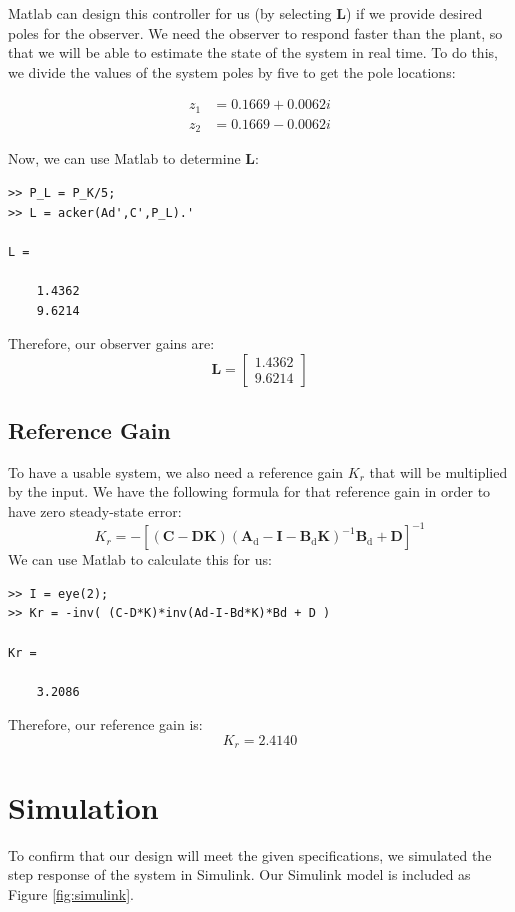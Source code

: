 \documentclass[11pt]{article}
\begin{document}
Matlab can design this controller for us (by selecting {\bf L}) if we provide desired poles for the observer.
We need the observer to respond faster than the plant, so that we will be able to estimate the state of the system in real time.
To do this, we divide the values of the system poles by five to get the pole locations:

\begin{align*}
z_1 &= 0.1669 + 0.0062i \\ z_2 &= 0.1669 - 0.0062i
\end{align*}

Now, we can use Matlab to determine {\bf L}:
\small
\begin{verbatim}
>> P_L = P_K/5;
>> L = acker(Ad',C',P_L).'

L =

    1.4362
    9.6214
\end{verbatim}

Therefore, our observer gains are:
\[\mathbf{L} = 
    \begin{bmatrix}
       1.4362 \\
       9.6214
    \end{bmatrix}
\]

\subsection*{Reference Gain}
To have a usable system, we also need a reference gain $K_r$ that will be multiplied by the input.
We have the following formula for that reference gain in order to have zero steady-state error:
\[K_r = -\mathbf{\left[(C-DK)(A_\mathrm{d}-I-B_\mathrm{d}K)^\mathrm{-1}B_\mathrm{d}+D\right]}^{-1}\]
We can use Matlab to calculate this for us:
\small
\begin{verbatim}
>> I = eye(2);
>> Kr = -inv( (C-D*K)*inv(Ad-I-Bd*K)*Bd + D )

Kr =

    3.2086
\end{verbatim}
Therefore, our reference gain is:
\[K_r = 2.4140\]
\pagebreak\section*{Simulation}
To confirm that our design will meet the given specifications, we simulated the step response of the system in Simulink.
Our Simulink model is included as Figure \ref{fig:simulink}. \\
\end{document}
